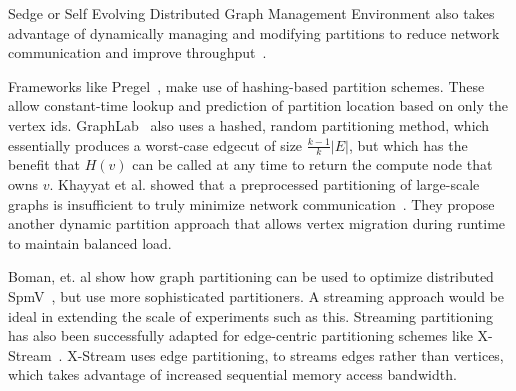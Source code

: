 Sedge or Self Evolving Distributed Graph Management Environment also takes advantage of dynamically managing and modifying partitions to reduce network communication and improve throughput~\cite{Yangpart}.

Frameworks like Pregel~\cite{Malpregel}, make use of hashing-based partition schemes.
These allow constant-time lookup and prediction of partition location based on only the vertex ids.
GraphLab~\cite{Low:2012:DGF:2212351.2212354} also uses a hashed, random partitioning method, which essentially produces a worst-case edgecut of size $\frac{k-1}{k}|E|$, but which has the benefit that $H(v)$ can be called at any time to return the compute node that owns $v$.  
Khayyat et al. showed that a preprocessed partitioning of large-scale graphs is insufficient to truly minimize network communication~\cite{khayyatmizan}.
They propose another dynamic partition approach that allows vertex migration during runtime to maintain balanced load.

Boman, et. al show how graph partitioning can be used to optimize distributed SpmV~\cite{Bomansc13}, but use more sophisticated partitioners. A streaming approach would be ideal in extending the scale of experiments such as this. 
Streaming partitioning has also been successfully adapted for edge-centric partitioning schemes like X-Stream~\cite{xstream}.
X-Stream uses edge partitioning, to streams edges rather than vertices, which takes advantage of increased sequential memory access bandwidth.




